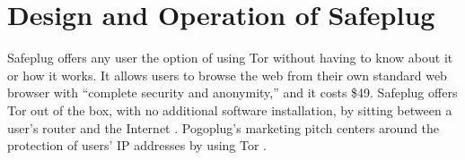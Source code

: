 \documentclass[letterpaper,twocolumn,10pt]{article}
\begin{document}




\section{Design and Operation of Safeplug}
Safeplug \cite{safeplug} offers any user the option of using Tor \cite{tor} without having to know about it or how it works.  It allows users to browse the web from their own standard web browser with “complete security and anonymity,” and it costs \$49.  Safeplug offers Tor out of the box, with no additional software installation, by sitting between a user's router and the Internet \cite{wired}.  Pogoplug's marketing pitch centers around the protection of users' IP addresses by using Tor \cite{bittech}.
\end{document}
